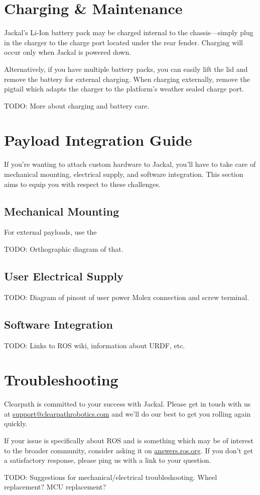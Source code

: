 \documentclass[]{clearpath-manual}
\begin{document}
\section{Charging \& Maintenance}

Jackal's Li-Ion battery pack may be charged internal to the chassis---simply plug in
the charger to the charge port located under the rear fender. Charging will occur
only when Jackal is powered down.

Alternatively, if you have multiple battery packs, you can easily lift the lid and
remove the battery for external charging. When charging externally, remove the pigtail
which adapts the charger to the platform's weather sealed charge port.

TODO: More about charging and battery care.


\section{Payload Integration Guide}

If you're wanting to attach custom hardware to Jackal, you'll have to take care of
mechanical mounting, electrical supply, and software integration. This section
aims to equip you with respect to these challenges.

\subsection{Mechanical Mounting}

For external payloads, use the 

TODO: Orthographic diagram of that.

\subsection{User Electrical Supply}\label{payload-elec}

TODO: Diagram of pinout of user power Molex connection and screw terminal.

\subsection{Software Integration}

TODO: Links to ROS wiki, information about URDF, etc.


\section{Troubleshooting}\label{trouble}

Clearpath is committed to your success with Jackal. Please get in touch with us at
\href{mailto:support@clearpathrobotics.com}{support@clearpathrobotics.com} and we'll do our
best to get you rolling again quickly.

If your issue is specifically about ROS and is something which may be of interest
to the broader community, consider asking it on \href{http://answers.ros.org}{answers.ros.org}.
If you don't get a satisfactory response, please ping us with a link to your question.

TODO: Suggestions for mechanical/electrical troubleshooting. Wheel replacement? MCU replacement? 
\end{document}
